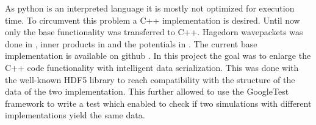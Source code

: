 As python is an interpreted language it is mostly not optimized for execution time. To circumvent this problem a C++ implementation is desired. Until now only the base functionality was transferred to C++. Hagedorn wavepackets was done in \cite{bt_michajab}, inner products in \cite{st_benedekv} and the potentials in \cite{bt_lionelm}. The current base implementation is available on github \cite{libwaveblocks}. In this project the goal was to enlarge the C++ code functionality with intelligent data serialization. This was done with the well-known HDF5 library to reach compatibility with the structure of the data of the two implementation. This further allowed to use the GoogleTest framework to write a test which enabled to check if two simulations with different implementations yield the same data.